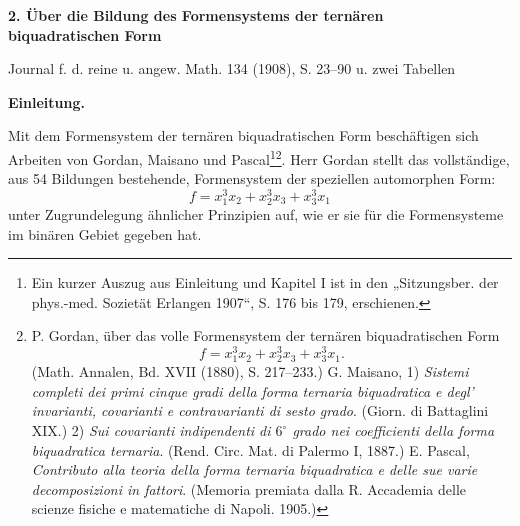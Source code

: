 \documentclass[11pt]{article}
\begin{document}
\begin{center}
{\Large\bfseries 2. Über die Bildung des Formensystems der ternären\\ biquadratischen Form}\par
\vspace{1.5em}
Journal f. d. reine u. angew. Math. 134 (1908), S. 23--90 u. zwei Tabellen
\end{center}

\vspace{3em}

\begin{center}
\textbf{Einleitung.}
\end{center}

Mit dem Formensystem der ternären biquadratischen Form beschäftigen sich Arbeiten von Gordan, Maisano und Pascal\footnote{Ein kurzer Auszug aus Einleitung und Kapitel I ist in den „Sitzungsber. der phys.-med. Sozietät Erlangen 1907“, S. 176 bis 179, erschienen.}\footnote{P. Gordan, über das volle Formensystem der ternären biquadratischen Form
\[
f=x_1^3x_2+x_2^3x_3+x_3^3x_1.
\]
(Math. Annalen, Bd. XVII (1880), S. 217--233.)
G. Maisano, 1) \emph{Sistemi completi dei primi cinque gradi della forma ternaria biquadratica e degl' invarianti, covarianti e contravarianti di sesto grado}. (Giorn. di Battaglini XIX.)
2) \emph{Sui covarianti indipendenti di $6^\circ$ grado nei coefficienti della forma biquadratica ternaria}. (Rend. Circ. Mat. di Palermo I, 1887.)
E. Pascal, \emph{Contributo alla teoria della forma ternaria biquadratica e delle sue varie decomposizioni in fattori}. (Memoria premiata dalla R. Accademia delle scienze fisiche e matematiche di Napoli. 1905.)}. Herr Gordan stellt das vollständige, aus 54 Bildungen bestehende, Formensystem der speziellen automorphen Form:
\[
f=x_1^3x_2+x_2^3x_3+x_3^3x_1
\]
unter Zugrundelegung ähnlicher Prinzipien auf, wie er sie für die Formensysteme im binären Gebiet gegeben hat.
\end{document}
